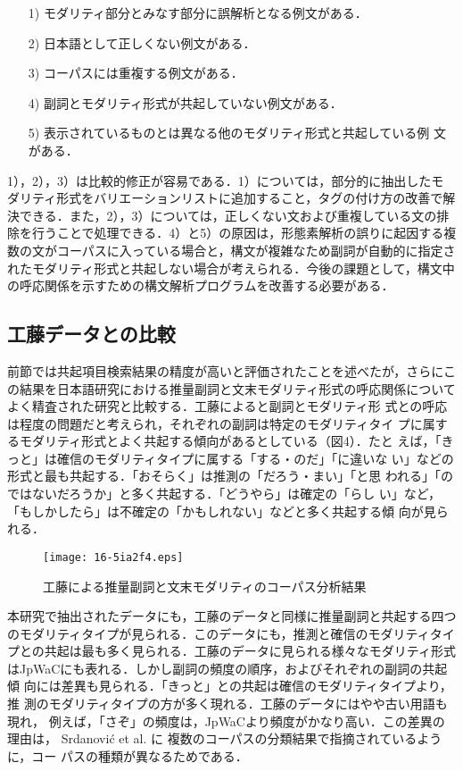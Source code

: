 \documentclass[japanese]{jnlp_1.4}
\begin{document}
\begin{itemize}
\item[1)] モダリティ部分とみなす部分に誤解析となる例文がある．
\item[2)] 日本語として正しくない例文がある．
\item[3)] コーパスには重複する例文がある．
\item[4)] 副詞とモダリティ形式が共起していない例文がある．
\item[5)] 表示されているものとは異なる他のモダリティ形式と共起している例
	   文がある．
\end{itemize}

1），2），3）は比較的修正が容易である．1）については，部分的に抽出したモ
ダリティ形式をバリエーションリストに追加すること，タグの付け方の改善で解
決できる．また，2），3）については，正しくない文および重複している文の排
除を行うことで処理できる．4）と5）の原因は，形態素解析の誤りに起因する複
数の文がコーパスに入っている場合と，構文が複雑なため副詞が自動的に指定さ
れたモダリティ形式と共起しない場合が考えられる．今後の課題として，構文中
の呼応関係を示すための構文解析プログラムを改善する必要がある． 


\subsection{工藤データとの比較}

前節では共起項目検索結果の精度が高いと評価されたことを述べたが，さらにこ
の結果を日本語研究における推量副詞と文末モダリティ形式の呼応関係について
よく精査された研究\cite{Kudou}と比較する．工藤によると副詞とモダリティ形
式との呼応は程度の問題だと考えられ，それぞれの副詞は特定のモダリティタイ
プに属するモダリティ形式とよく共起する傾向があるとしている（図4）．たと
えば，「きっと」は確信のモダリティタイプに属する「する・のだ」「に違いな
い」などの形式と最も共起する．「おそらく」は推測の「だろう・まい」「と思
われる」「のではないだろうか」と多く共起する．「どうやら」は確定の「らし
い」など，「もしかしたら」は不確定の「かもしれない」などと多く共起する傾
向が見られる．

\begin{figure}[t]
\begin{center}
\texttt{[image: 16-5ia2f4.eps]}
\end{center}
\caption{工藤による推量副詞と文末モダリティのコーパス分析結果}
\end{figure}

本研究で抽出されたデータにも，工藤のデータと同様に推量副詞と共起する四つ
のモダリティタイプが見られる．このデータにも，推測と確信のモダリティタイ
プとの共起は最も多く見られる．工藤のデータに見られる様々なモダリティ形式
はJpWaCにも表れる．しかし副詞の頻度の順序，およびそれぞれの副詞の共起傾
向には差異も見られる．「きっと」との共起は確信のモダリティタイプより，推
測のモダリティタイプの方が多く現れる．工藤のデータにはやや古い用語も現れ，
例えば，「さぞ」の頻度は，JpWaCより頻度がかなり高い．この差異の理由は，
    Srdanovi\'{c} et al. \citeyear{Srdanovic2008c}に
複数のコーパスの分類結果で指摘されているように，コー
パスの種類が異なるためである．
\end{document}
